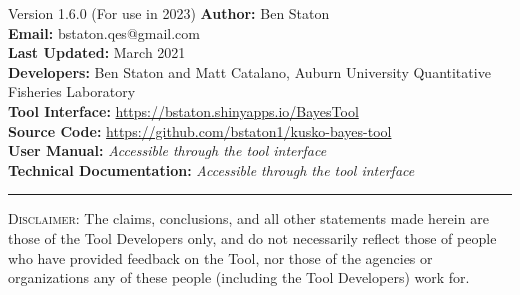 \begin{bclogo}[margeG=-1.5,margeD=-1.5,logo=\hspace{17pt},couleurBarre=black, noborder=false,couleur=light-grey]{Version 1.6.0 (For use in 2023)}
   \textbf{Author:} Ben Staton \\[3pt]
   \textbf{Email:} bstaton.qes@gmail.com \\[3pt]
   \textbf{Last Updated:} March 2021 \\[3pt]
   \textbf{Developers:} Ben Staton and Matt Catalano, Auburn University Quantitative Fisheries Laboratory \\[3pt]
   \textbf{Tool Interface:} \url{https://bstaton.shinyapps.io/BayesTool} \\[3pt]
   \textbf{Source Code:} \url{https://github.com/bstaton1/kusko-bayes-tool} \\[3pt]
   \textbf{User Manual:} \textit{Accessible through the tool interface} \\[3pt]
   \textbf{Technical Documentation:} \textit{Accessible through the tool interface}
  \hrule
  \footnotesize{\textsc{Disclaimer}: The claims, conclusions, and all other statements made herein are those of the Tool Developers only, and do not necessarily reflect those of people who have provided feedback on the Tool, nor those of the agencies or organizations any of these people (including the Tool Developers) work for}.
\end{bclogo}
